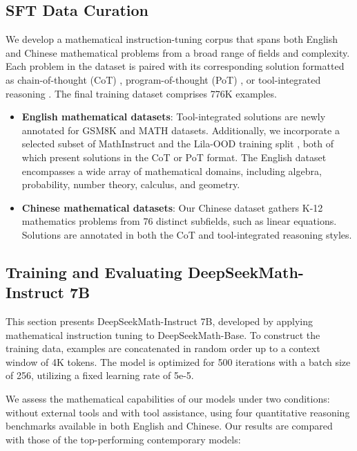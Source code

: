 \subsection{SFT Data Curation}

We develop a mathematical instruction-tuning corpus that spans both English and Chinese mathematical problems from a broad range of fields and complexity. Each problem in the dataset is paired with its corresponding solution formatted as chain-of-thought (CoT) \citep{cot}, program-of-thought (PoT) \citep{pot,pal}, or tool-integrated reasoning \citep{tora}. The final training dataset comprises 776K examples.

\begin{itemize}[topsep=0pt]
    \item \textbf{English mathematical datasets}: Tool-integrated solutions are newly annotated for GSM8K and MATH datasets. Additionally, we incorporate a selected subset of MathInstruct \citep{MathInstruct} and the Lila-OOD training split \citep{lila}, both of which present solutions in the CoT or PoT format. The English dataset encompasses a wide array of mathematical domains, including algebra, probability, number theory, calculus, and geometry.
    \item \textbf{Chinese mathematical datasets}: Our Chinese dataset gathers K-12 mathematics problems from 76 distinct subfields, such as linear equations. Solutions are annotated in both the CoT and tool-integrated reasoning styles.
\end{itemize}

\subsection{Training and Evaluating DeepSeekMath-Instruct 7B}

This section presents DeepSeekMath-Instruct 7B, developed by applying mathematical instruction tuning to DeepSeekMath-Base. To construct the training data, examples are concatenated in random order up to a context window of 4K tokens. The model is optimized for 500 iterations with a batch size of 256, utilizing a fixed learning rate of 5e-5.

We assess the mathematical capabilities of our models under two conditions: without external tools and with tool assistance, using four quantitative reasoning benchmarks available in both English and Chinese. Our results are compared with those of the top-performing contemporary models:

